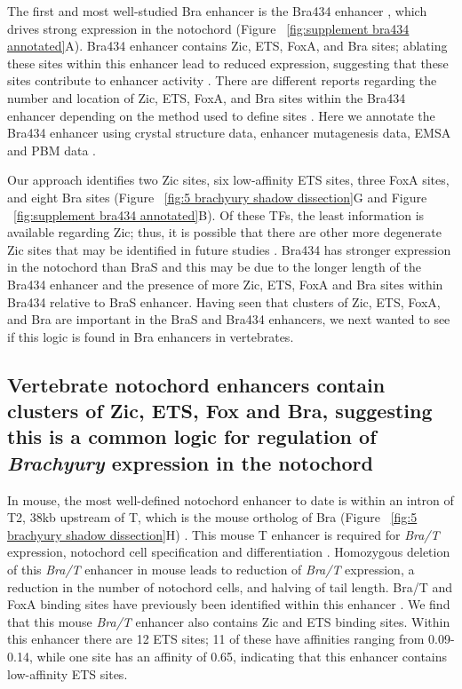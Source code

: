 The first and most well-studied Bra enhancer is the Bra434 enhancer \cite{corbo1997,fujiwara1998}, which drives strong expression in the notochord (Figure ~\ref{fig:supplement bra434 annotated}A).  Bra434 enhancer contains Zic, ETS, FoxA, and Bra sites; ablating these sites within this enhancer lead to reduced expression, suggesting that these sites contribute to enhancer activity \cite{reeves2021,shimai2022}. There are different reports regarding the number and location of Zic, ETS, FoxA, and Bra sites within the Bra434 enhancer depending on the method used to define sites \cite{corbo1997,shimai2022}. Here we annotate the Bra434 enhancer using crystal structure data, enhancer mutagenesis data, EMSA and PBM data \cite{casey1998,conlon2001,digregorio1999,dunn2009,katikala2013,lamber2008,li2017,matsumoto2007a,muller1997,passamaneck2009a,takahashi1999,wei2010,yagi2004}. 

Our approach identifies two Zic sites, six low-affinity ETS sites, three FoxA sites, and eight Bra sites (Figure ~\ref{fig:5 brachyury shadow dissection}G and Figure ~\ref{fig:supplement bra434 annotated}B). Of these TFs, the least information is available regarding Zic; thus, it is possible that there are other more degenerate Zic sites that may be identified in future studies \cite{corbo1997,fujiwara1998,reeves2021,shimai2022}. Bra434 has stronger expression in the notochord than BraS and this may be due to the longer length of the Bra434 enhancer and the presence of more Zic, ETS, FoxA and Bra sites within Bra434 relative to BraS enhancer. Having seen that clusters of Zic, ETS, FoxA, and Bra are important in the BraS and Bra434 enhancers, we next wanted to see if this logic is found in Bra enhancers in vertebrates.

\subsection{Vertebrate notochord enhancers contain clusters of Zic, ETS, Fox and Bra, suggesting this is a common logic for regulation of \textit{Brachyury} expression in the notochord}

In mouse, the most well-defined notochord enhancer to date is within an intron of T2, 38kb upstream of T, which is the mouse ortholog of Bra (Figure ~\ref{fig:5 brachyury shadow dissection}H) \cite{schifferl2021}. This mouse T enhancer is required for \textit{Bra/T} expression, notochord cell specification and differentiation \cite{schifferl2021}. Homozygous deletion of this \textit{Bra/T} enhancer in mouse leads to reduction of \textit{Bra/T} expression, a reduction in the number of notochord cells, and halving of tail length. Bra/T and FoxA binding sites have previously been identified within this enhancer \cite{schifferl2021}. We find that this mouse \textit{Bra/T} enhancer also contains Zic and ETS binding sites. Within this enhancer there are 12 ETS sites; 11 of these have affinities ranging from 0.09-0.14, while one site has an affinity of 0.65, indicating that this enhancer contains low-affinity ETS sites. 

